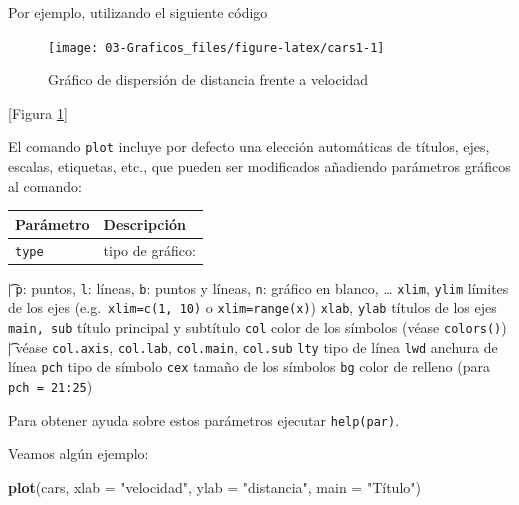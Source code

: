 \documentclass[]{book}
\newenvironment{Shaded}{\begin{snugshade}}{\end{snugshade}}
\newcommand{\CommentTok}[1]{\textcolor[rgb]{0.56,0.35,0.01}{\textit{#1}}}
\newcommand{\DataTypeTok}[1]{\textcolor[rgb]{0.13,0.29,0.53}{#1}}
\newcommand{\KeywordTok}[1]{\textcolor[rgb]{0.13,0.29,0.53}{\textbf{#1}}}
\newcommand{\NormalTok}[1]{#1}
\newcommand{\OperatorTok}[1]{\textcolor[rgb]{0.81,0.36,0.00}{\textbf{#1}}}
\newcommand{\StringTok}[1]{\textcolor[rgb]{0.31,0.60,0.02}{#1}}
\begin{document}
Por ejemplo, utilizando el siguiente código

\begin{Shaded}
\end{Shaded}

\begin{figure}[!htb]

{\centering \texttt{[image: 03-Graficos\_files/figure-latex/cars1-1]} 

}

\caption{Gráfico de dispersión de distancia frente a velocidad}\label{fig:cars1}
\end{figure}

{[}Figura \ref{fig:cars1}{]}

El comando \texttt{plot} incluye por defecto una elección automáticas de
títulos, ejes, escalas, etiquetas, etc., que pueden ser modificados
añadiendo parámetros gráficos al comando:

\begin{longtable}[]{@{}ll@{}}
\toprule
Parámetro & Descripción\tabularnewline
\midrule
\endhead
\texttt{type} & tipo de gráfico:\tabularnewline
\bottomrule
\end{longtable}

\t      | \texttt{p}: puntos, \texttt{l}: líneas, \texttt{b}: puntos y líneas, \texttt{n}: gráfico en blanco, \ldots{}
\texttt{xlim}, \texttt{ylim} \textbar{} límites de los ejes (e.g.~\texttt{xlim=c(1,\ 10)} o \texttt{xlim=range(x)})
\texttt{xlab}, \texttt{ylab} \textbar{} títulos de los ejes
\texttt{main,\ sub} \textbar{} título principal y subtítulo
\texttt{col} \textbar{} color de los símbolos (véase \texttt{colors()})
\t     | véase \texttt{col.axis}, \texttt{col.lab}, \texttt{col.main}, \texttt{col.sub}
\texttt{lty} \textbar{} tipo de línea
\texttt{lwd} \textbar{} anchura de línea
\texttt{pch} \textbar{} tipo de símbolo
\texttt{cex} \textbar{} tamaño de los símbolos
\texttt{bg} \textbar{} color de relleno (para \texttt{pch\ =\ 21:25})

Para obtener ayuda sobre estos parámetros ejecutar \texttt{help(par)}.

Veamos algún ejemplo:

\begin{Shaded}
\begin{Highlighting}[]
\KeywordTok{plot}\NormalTok{(cars, }\DataTypeTok{xlab =} \StringTok{"velocidad"}\NormalTok{, }\DataTypeTok{ylab =} \StringTok{"distancia"}\NormalTok{, }\DataTypeTok{main =} \StringTok{"Título"}\NormalTok{)}
\end{Highlighting}
\end{Shaded}
\end{document}
